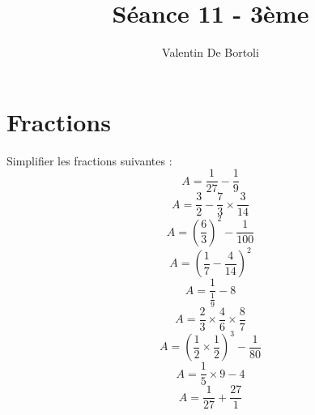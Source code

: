 \documentclass[10pt,a4paper]{article}
\title{Séance 11 - 3ème}
\author{Valentin De Bortoli}
\begin{document}
\maketitle
\section{Fractions}
Simplifier les fractions suivantes :
\begin{equation}
A = \frac{1}{27} - \frac{1}{9}
\end{equation}
\begin{equation}
A = \frac{3}{2} - \frac{7}{3} \times \frac{3}{14}
\end{equation}
\begin{equation}
A = \left(\frac{6}{3}\right)^2 - \frac{1}{100}
\end{equation}
\begin{equation}
A = \left(\frac{1}{7} - \frac{4}{14}\right)^2
\end{equation}
\begin{equation}
A = \frac{1}{\frac{1}{9}} - 8
\end{equation}
\begin{equation}
A = \frac{2}{3} \times \frac{4}{6} \times \frac{8}{7}
\end{equation}
\begin{equation}
A = \left(\frac{1}{2}\times \frac{1}{2}\right)^3 - \frac{1}{80}
\end{equation}
\begin{equation}
A = \frac{1}{5}\times 9 - 4
\end{equation}
\begin{equation}
A = \frac{1}{27} + \frac{27}{1}
\end{equation}
\end{document}
